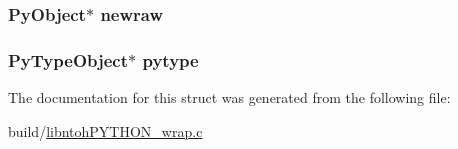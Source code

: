 \hypertarget{struct_swig_py_client_data_ac343cdc04c579bb3d46e9be516791975}{
\subsubsection[{newraw}]{\setlength{\rightskip}{0pt plus 5cm}Py\-Object$\ast$ newraw}}\label{struct_swig_py_client_data_ac343cdc04c579bb3d46e9be516791975}
\hypertarget{struct_swig_py_client_data_a2cb2eada29f00a41140382c4d3bfad61}{
\subsubsection[{pytype}]{\setlength{\rightskip}{0pt plus 5cm}Py\-Type\-Object$\ast$ pytype}}\label{struct_swig_py_client_data_a2cb2eada29f00a41140382c4d3bfad61}


The documentation for this struct was generated from the following file\-:\begin{DoxyCompactItemize}
\item 
build/\hyperlink{libntoh_p_y_t_h_o_n__wrap_8c}{libntoh\-P\-Y\-T\-H\-O\-N\-\_\-wrap.\-c}\end{DoxyCompactItemize}
